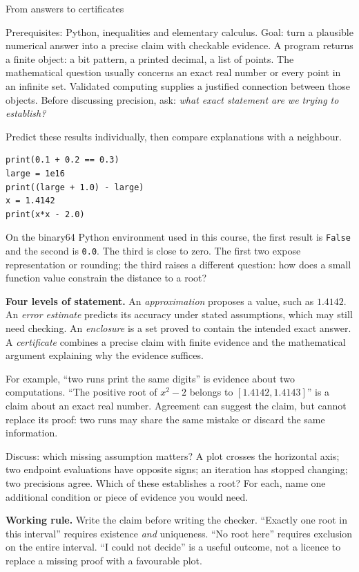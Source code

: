 \def\lecturenumber{01}


\opening{From answers to certificates}{Prerequisites: Python, inequalities and elementary calculus.\newline
Goal: turn a plausible numerical answer into a precise claim with checkable evidence.}
A program returns a finite object: a bit pattern, a printed decimal, a list of points.
The mathematical question usually concerns an exact real number or every point in
an infinite set. Validated computing supplies a justified connection between those
objects. Before discussing precision, ask: \emph{what exact statement are we trying to establish?}

Predict these results individually, then compare explanations with a neighbour.
\begin{lstlisting}
print(0.1 + 0.2 == 0.3)
large = 1e16
print((large + 1.0) - large)
x = 1.4142
print(x*x - 2.0)
\end{lstlisting}
On the binary64 Python environment used in this course, the first result is
\texttt{False} and the second is \texttt{0.0}. The third is close to zero.
The first two expose representation or rounding; the third raises a different
question: how does a small function value constrain the distance to a root?

\textbf{Four levels of statement.}
An \emph{approximation} proposes a value, such as $1.4142$.
An \emph{error estimate} predicts its accuracy under stated assumptions, which
may still need checking. An \emph{enclosure} is a set proved to contain the intended
exact answer. A \emph{certificate} combines a precise claim with finite evidence
and the mathematical argument explaining why the evidence suffices.

For example, ``two runs print the same digits'' is evidence about two computations.
``The positive root of $x^2-2$ belongs to $[1.4142,1.4143]$'' is a claim about an
exact real number. Agreement can suggest the claim, but cannot replace its proof:
two runs may share the same mistake or discard the same information.

\begin{question}{Discuss: which missing assumption matters?}
A plot crosses the horizontal axis; two endpoint evaluations have opposite signs;
an iteration has stopped changing; two precisions agree. Which of these establishes
a root? For each, name one additional condition or piece of evidence you would need.
\end{question}
\textbf{Working rule.} Write the claim before writing the checker. ``Exactly one root
in this interval'' requires existence \emph{and} uniqueness. ``No root here'' requires
exclusion on the entire interval. ``I could not decide'' is a useful outcome, not a
licence to replace a missing proof with a favourable plot.

